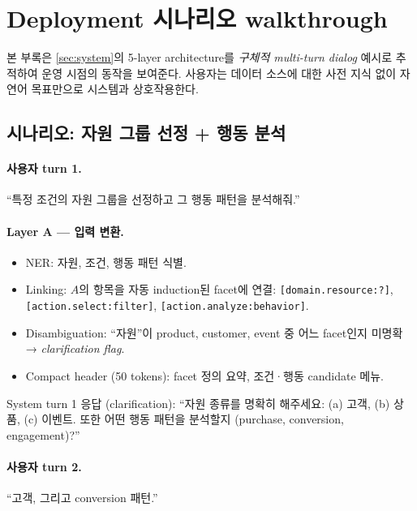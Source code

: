 
\section{Deployment 시나리오 walkthrough}
\label{app:scenario}

본 부록은 \cref{sec:system}의 5-layer architecture를 \emph{구체적 multi-turn dialog} 예시로 추적하여 운영 시점의 동작을 보여준다. 사용자는 데이터 소스에 대한 사전 지식 없이 자연어 목표만으로 시스템과 상호작용한다.

\subsection{시나리오: 자원 그룹 선정 + 행동 분석}

\paragraph{사용자 turn 1.}
``특정 조건의 자원 그룹을 선정하고 그 행동 패턴을 분석해줘.''

\paragraph{Layer A — 입력 변환.}
\begin{itemize}[leftmargin=*]
\item NER: 자원, 조건, 행동 패턴 식별.
\item Linking: $A$의 항목을 자동 induction된 facet에 연결: \texttt{[domain.resource:?]}, \texttt{[action.select:filter]}, \texttt{[action.analyze:behavior]}.
\item Disambiguation: ``자원''이 product, customer, event 중 어느 facet인지 미명확 → \emph{clarification flag}.
\item Compact header (50 tokens): facet 정의 요약, 조건·행동 candidate 메뉴.
\end{itemize}

System turn 1 응답 (clarification): ``자원 종류를 명확히 해주세요: (a) 고객, (b) 상품, (c) 이벤트. 또한 어떤 행동 패턴을 분석할지 (purchase, conversion, engagement)?''

\paragraph{사용자 turn 2.}
``고객, 그리고 conversion 패턴.''

